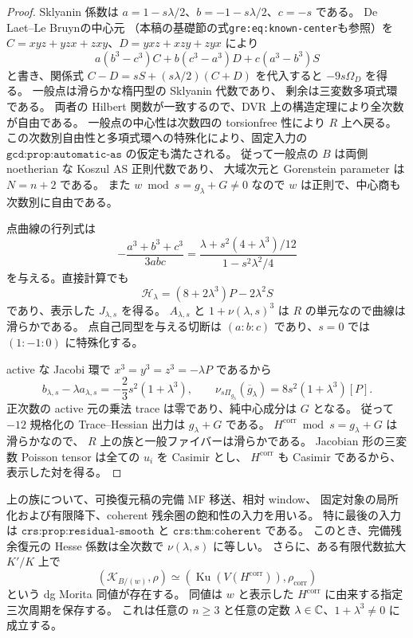 \begin{proof}
Sklyanin 係数は
$a=1-s\lambda/2$、$b=-1-s\lambda/2$、$c=-s$ である。
De Laet--Le Bruyn\cite[Section~2, preprint p.~3]{NFMDLL}の中心元
（本稿の基礎節の式\texttt{gre:eq:known-center}も参照）を
$C=xyz+yzx+zxy$、$D=yxz+xzy+zyx$ により
\[
 a(b^3-c^3)C+b(c^3-a^3)D+c(a^3-b^3)S
\]
と書き、関係式 $C-D=sS+(s\lambda/2)(C+D)$ を代入すると
$-9s\Omega_D$ を得る。
一般点は滑らかな楕円型の Sklyanin 代数であり、
剰余は三変数多項式環である。
両者の Hilbert 関数が一致するので、DVR 上の構造定理により全次数が自由である。
一般点の中心性は次数四の torsionfree 性により $R$ 上へ戻る。
この次数別自由性と多項式環への特殊化により、固定入力の
$\texttt{gcd:prop:automatic-as}$ の仮定も満たされる。
従って一般点の $B$ は両側 noetherian な Koszul AS 正則代数であり、
大域次元と Gorenstein parameter は $N=n+2$ である。
また $w\bmod s=g_\lambda+G\ne0$ なので $w$ は正則で、中心商も次数別に自由である。

点曲線の行列式は
\[
 -\frac{a^3+b^3+c^3}{3abc}
 =\frac{\lambda+s^2(4+\lambda^3)/12}{1-s^2\lambda^2/4}
\]
を与える。直接計算でも
\[
 \mathscr H_\lambda=(8+2\lambda^3)P-2\lambda^2S
\]
であり、表示した $J_{\lambda,s}$ を得る。
$A_{\lambda,s}$ と $1+\nu(\lambda,s)^3$ は $R$ の単元なので曲線は滑らかである。
点自己同型を与える切断は $(a:b:c)$ であり、$s=0$ では $(1:-1:0)$ に特殊化する。

active な Jacobi 環で $x^3=y^3=z^3=-\lambda P$ であるから
\[
 b_{\lambda,s}-\lambda a_{\lambda,s}
 =-\frac23s^2(1+\lambda^3),\qquad
 \nu_{s\Pi_{g_\lambda}}(\overline g_\lambda)
 =8s^2(1+\lambda^3)[P].
\]
正次数の active 元の乗法 trace は零であり、純中心成分は $G$ となる。
従って $-12$ 規格化の Trace--Hessian 出力は $g_\lambda+G$ である。
$H^{\mathrm{corr}}\bmod s=g_\lambda+G$ は滑らかなので、
$R$ 上の族と一般ファイバーは滑らかである。
Jacobian 形の三変数 Poisson tensor は全ての $u_i$ を Casimir とし、
$H^{\mathrm{corr}}$ も Casimir であるから、表示した対を得る。
\end{proof}

\begin{theorem}
\label{thm:nfm-split-corrected-residual}
上の族について、可換復元稿の完備 MF 移送、相対 window、
固定対象の局所化および有限降下、coherent 残余圏の飽和性の入力を用いる。
特に最後の入力は $\texttt{crs:prop:residual-smooth}$ と
$\texttt{crs:thm:coherent}$ である。
このとき、完備残余復元の Hesse 係数は全次数で $\nu(\lambda,s)$ に等しい。
さらに、ある有限代数拡大 $K'/K$ 上で
\[
 (\mathcal K_{B/(w)},\rho)
 \simeq
 (\operatorname{Ku}(V(H^{\mathrm{corr}})),\rho_{\mathrm{corr}})
\]
という dg Morita 同値が存在する。
同値は $w$ と表示した $H^{\mathrm{corr}}$ に由来する指定三次周期を保存する。
これは任意の $n\ge3$ と任意の定数 $\lambda\in\mathbb C$、$1+\lambda^3\ne0$ に成立する。
\end{theorem}

